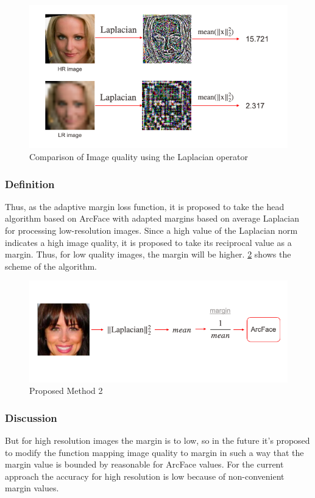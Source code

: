 \documentclass[11pt,a4paper]{article}
\begin{document}
\begin{figure}[ht!]
    \centering
    \includegraphics[width=\textwidth]{image_quality.png}
    \caption{Comparison of Image quality using the Laplacian operator}
    \label{fig:image_quality}
\end{figure}

\subsubsection{Definition}
Thus, as the adaptive margin loss function, it is proposed to take the head algorithm based on ArcFace with adapted margins based on average Laplacian for processing low-resolution images. Since a high value of the Laplacian norm indicates a high image quality, it is proposed to take its reciprocal value as a margin. Thus, for low quality images, the margin will be higher. \ref{fig:app2} shows the scheme of the algorithm.

\begin{figure}[ht!]
    \centering
    \includegraphics[width=\textwidth]{app2.png}
    \caption{Proposed Method 2}
    \label{fig:app2}
\end{figure}

\subsubsection{Discussion}
But for high resolution images the margin is to low, so in the future it's proposed to modify the function mapping image quality  to margin in such a way that the margin value is bounded by reasonable for ArcFace \cite{arcface} values. For the current approach the accuracy for high resolution is low because of non-convenient margin values.  
\end{document}

